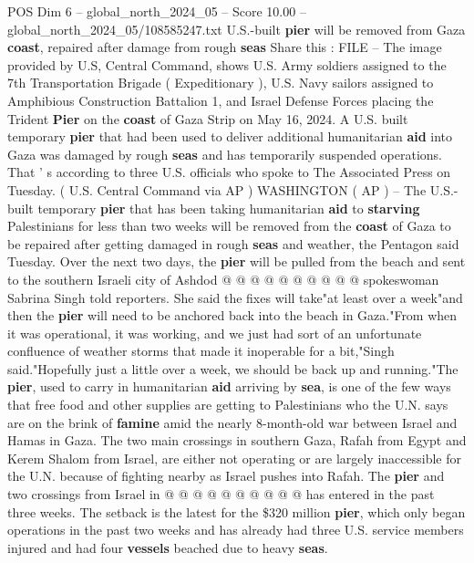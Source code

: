 \begin{textsample}{POS Dim 6 – global\_north\_2024\_05 – Score 10.00 – global\_north\_2024\_05/108585247.txt}  \label{ex:f6_pos_146}
U.S.-built \textbf{pier} will be removed from Gaza \textbf{coast}, repaired after damage from rough \textbf{seas} Share this : FILE -- The image provided by U.S, Central Command, shows U.S.
Army soldiers assigned to the 7th Transportation Brigade ( Expeditionary ), U.S.
Navy sailors assigned to Amphibious Construction Battalion 1, and Israel Defense Forces placing the Trident \textbf{Pier} on the \textbf{coast} of Gaza Strip on May 16, 2024.
A U.S. built temporary \textbf{pier} that had been used to deliver additional humanitarian \textbf{aid} into Gaza was damaged by rough \textbf{seas} and has temporarily suspended operations.
That ' s according to three U.S. officials who spoke to The Associated Press on Tuesday. ( U.S.
Central Command via AP ) WASHINGTON ( AP ) -- The U.S.-built temporary \textbf{pier} that has been taking humanitarian \textbf{aid} to \textbf{starving} Palestinians for less than two weeks will be removed from the \textbf{coast} of Gaza to be repaired after getting damaged in rough \textbf{seas} and weather, the Pentagon said Tuesday.
Over the next two days, the \textbf{pier} will be pulled from the beach and sent to the southern Israeli city of Ashdod @ @ @ @ @ @ @ @ @ @ spokeswoman Sabrina Singh told reporters.
She said the fixes will take"at least over a week"and then the \textbf{pier} will need to be anchored back into the beach in Gaza."From when it was operational, it was working, and we just had sort of an unfortunate confluence of weather storms that made it inoperable for a bit,"Singh said."Hopefully just a little over a week, we should be back up and running."The \textbf{pier}, used to carry in humanitarian \textbf{aid} arriving by \textbf{sea}, is one of the few ways that free food and other supplies are getting to Palestinians who the U.N. says are on the brink of \textbf{famine} amid the nearly 8-month-old war between Israel and Hamas in Gaza.
The two main crossings in southern Gaza, Rafah from Egypt and Kerem Shalom from Israel, are either not operating or are largely inaccessible for the U.N. because of fighting nearby as Israel pushes into Rafah.
The \textbf{pier} and two crossings from Israel in @ @ @ @ @ @ @ @ @ @ has entered in the past three weeks.
The setback is the latest for the \$320 million \textbf{pier}, which only began operations in the past two weeks and has already had three U.S. service members injured and had four \textbf{vessels} beached due to heavy \textbf{seas}.

\end{textsample}

